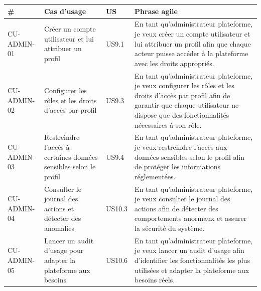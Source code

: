 \documentclass[
  paper=a4,
  oneside  ,captions=tableheading
]{scrartcl}
\begin{document}
{\def\LTcaptype{none} %
\begin{longtable}[]{@{}
  >{\raggedright\arraybackslash}p{}
  >{\raggedright\arraybackslash}p{}
  >{\raggedright\arraybackslash}p{}
  >{\raggedright\arraybackslash}p{}@{}}
\toprule\noalign{}
\begin{minipage}[b]{\linewidth}\raggedright
\#
\end{minipage} & \begin{minipage}[b]{\linewidth}\raggedright
Cas d'usage
\end{minipage} & \begin{minipage}[b]{\linewidth}\raggedright
US
\end{minipage} & \begin{minipage}[b]{\linewidth}\raggedright
Phrase agile
\end{minipage} \\
\midrule\noalign{}
\endhead
\bottomrule\noalign{}
\endlastfoot
CU-ADMIN-01 & Créer un compte utilisateur et lui attribuer un profil &
US9.1 & En tant qu'administrateur plateforme, je veux créer un compte
utilisateur et lui attribuer un profil afin que chaque acteur puisse
accéder à la plateforme avec les droits appropriés. \\
CU-ADMIN-02 & Configurer les rôles et les droits d'accès par profil &
US9.3 & En tant qu'administrateur plateforme, je veux configurer les
rôles et les droits d'accès par profil afin de garantir que chaque
utilisateur ne dispose que des fonctionnalités nécessaires à son
rôle. \\
CU-ADMIN-03 & Restreindre l'accès à certaines données sensibles selon le
profil & US9.4 & En tant qu'administrateur plateforme, je veux
restreindre l'accès aux données sensibles selon le profil afin de
protéger les informations réglementées. \\
CU-ADMIN-04 & Consulter le journal des actions et détecter des anomalies
& US10.3 & En tant qu'administrateur plateforme, je veux consulter le
journal des actions afin de détecter des comportements anormaux et
assurer la sécurité du système. \\
CU-ADMIN-05 & Lancer un audit d'usage pour adapter la plateforme aux
besoins & US10.6 & En tant qu'administrateur plateforme, je veux lancer
un audit d'usage afin d'identifier les fonctionnalités les plus
utilisées et adapter la plateforme aux besoins réels. \\
\end{longtable}
}
\end{document}
